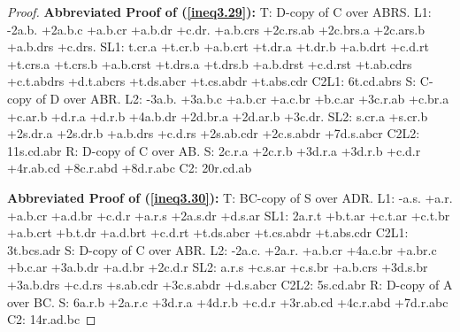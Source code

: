 \documentclass[10pt,journal]{IEEEtran}
\begin{document}
\begin{proof}
{\bf Abbreviated Proof of (\ref{ineq3.29}):}
T: D-copy of C over ABRS.\newline
L1: -2a.b. +2a.b.c +a.b.cr +a.b.dr +c.dr. +a.b.crs +2c.rs.ab +2c.brs.a +2c.ars.b +a.b.drs +c.drs.\newline
SL1: t.cr.a +t.cr.b +a.b.crt +t.dr.a +t.dr.b +a.b.drt +c.d.rt +t.crs.a +t.crs.b +a.b.crst +t.drs.a +t.drs.b +a.b.drst +c.d.rst +t.ab.cdrs +c.t.abdrs +d.t.abcrs +t.ds.abcr +t.cs.abdr +t.abs.cdr
C2L1: 6t.cd.abrs\newline
S: C-copy of D over ABR.\newline
L2: -3a.b. +3a.b.c +a.b.cr +a.c.br +b.c.ar +3c.r.ab +c.br.a +c.ar.b +d.r.a +d.r.b +4a.b.dr +2d.br.a +2d.ar.b +3c.dr.\newline
SL2: s.cr.a +s.cr.b +2s.dr.a +2s.dr.b +a.b.drs +c.d.rs +2s.ab.cdr +2c.s.abdr +7d.s.abcr\newline
C2L2: 11s.cd.abr\newline
R: D-copy of C over AB.\newline
S: 2c.r.a +2c.r.b +3d.r.a +3d.r.b +c.d.r +4r.ab.cd +8c.r.abd +8d.r.abc\newline
C2: 20r.cd.ab\newline


{\bf Abbreviated Proof of (\ref{ineq3.30}):}
T: BC-copy of S over ADR.\newline
L1: -a.s. +a.r. +a.b.cr +a.d.br +c.d.r +a.r.s +2a.s.dr +d.s.ar\newline
SL1: 2a.r.t +b.t.ar +c.t.ar +c.t.br +a.b.crt +b.t.dr +a.d.brt +c.d.rt +t.ds.abcr +t.cs.abdr +t.abs.cdr
C2L1: 3t.bcs.adr\newline
S: D-copy of C over ABR.\newline
L2: -2a.c. +2a.r. +a.b.cr +4a.c.br +a.br.c +b.c.ar +3a.b.dr +a.d.br +2c.d.r\newline
SL2: a.r.s +c.s.ar +c.s.br +a.b.crs +3d.s.br +3a.b.drs +c.d.rs +s.ab.cdr +3c.s.abdr +d.s.abcr\newline
C2L2: 5s.cd.abr\newline
R: D-copy of A over BC.\newline
S: 6a.r.b +2a.r.c +3d.r.a +4d.r.b +c.d.r +3r.ab.cd +4c.r.abd +7d.r.abc\newline
C2: 14r.ad.bc\newline



\end{proof}
\end{document}
